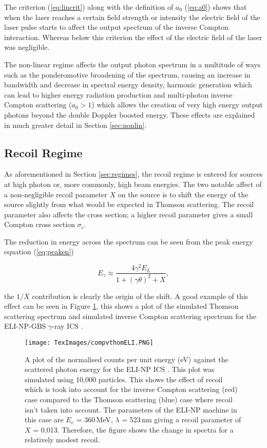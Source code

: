 \documentclass[11pt]{article}
\begin{document}
\noindent The criterion (\ref{eq:lincrit}) along with the definition of $a_{0}$ (\ref{eq:a0}) shows that when the laser reaches a certain field strength or intensity the electric field of the laser pulse starts to affect the output spectrum of the inverse Compton interaction. Whereas below this criterion the effect of the electric field of the laser was negligible.
  
The non-linear regime affects the output photon spectrum in a multitude of ways such as the ponderomotive broadening of the spectrum, causing an increase in bandwidth and decrease in spectral energy density, harmonic generation which can lead to higher energy radiation production and multi-photon inverse Compton scattering ($a_{0} > 1$) which allows the creation of very high energy output photons beyond the double Doppler boosted energy. These effects are explained in much greater detail in Section \ref{sec:nonlin}.  
 
\subsection{Recoil Regime}
\label{sec:recoil}

As aforementioned in Section \ref{sec:regimes}, the recoil regime is entered for sources at high photon or, more commonly, high beam energies. The two notable affect of a non-negligible recoil parameter $X$ on the source is to shift the energy of the source slightly from what would be expected in Thomson scattering. The recoil parameter also affects the cross section; a higher recoil parameter gives a small Compton cross section $\sigma_{c}$.

The reduction in energy across the spectrum can be seen from the peak energy equation (\ref{eq:peaken})

\begin{equation*}
E_{\gamma} \approx \frac{4\gamma^{2}E_{L}}{1+\left(\gamma\theta\right)^{2}+X},
\end{equation*}

\noindent the $1/X$ contribution is clearly the origin of the shift. A good example of this effect can be seen in Figure \ref{fig:ELIthomvcomp}, this shows a plot of the simulated Thomson scattering spectrum and simulated inverse Compton scattering spectrum for the ELI-NP-GBS $\gamma$-ray ICS \cite{ELINPwp}.

\begin{figure}[H]
\centering
\texttt{[image: TexImages/compvthomELI.PNG]}
\caption{\label{fig:ELIthomvcomp} A plot of the normalised counts per unit energy (eV) against the scattered photon energy for the ELI-NP ICS \cite{KrafftLaserPulsing}. This plot was simulated using 10,000 particles. This shows the effect of recoil which is took into account for the inverse Compton scattering (red) case compared to the Thomson scattering (blue) case where recoil isn't taken into account. The parameters of the ELI-NP machine in this case are $E_{e}$ = 360\,MeV, $\lambda$ = 523\,nm giving a recoil parameter of $X$ = 0.013. Therefore, the figure shows the change in spectra for a relatively modest recoil.}
\end{figure} 
\end{document}
